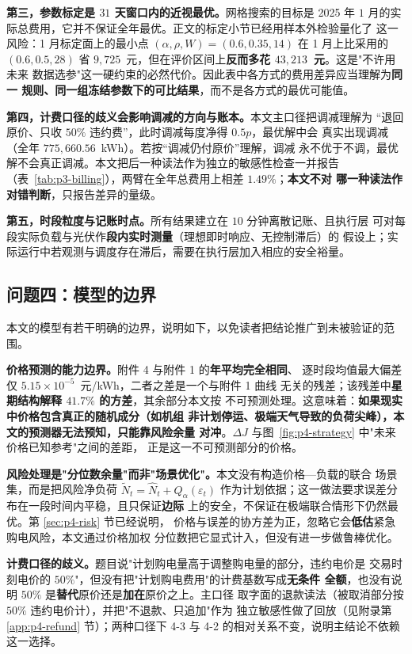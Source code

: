 \textbf{第三，参数标定是 $31$ 天窗口内的近视最优。}网格搜索的目标是 2025 年
$1$ 月的实际总费用，它并不保证全年最优。正文的标定小节已经用样本外检验量化了
这一风险：1 月标定面上的最小点
$(\alpha,\rho,W)=(0.6,0.35,14)$ 在 1 月上比采用的 $(0.6,0.5,28)$ 省
$9{,}725$~元，但在评价区间上\textbf{反而多花 $43{,}213$~元}。这是"不许用未来
数据选参"这一硬约束的必然代价。因此表中各方式的费用差异应当理解为\textbf{同一
规则、同一组冻结参数下的可比结果}，而不是各方式的最优可能值。

\textbf{第四，计费口径的歧义会影响调减的方向与账本。}本文主口径把调减理解为
“退回原价、只收 $50\%$ 违约费”，此时调减每度净得 $0.5p$，最优解中会
真实出现调减（全年 $775{,}660.56$~kWh）。若按“调减仍付原价”理解，调减
永不优于不调，最优解不会真正调减。本文把后一种读法作为独立的敏感性检查一并报告
（表~\ref{tab:p3-billing}），两臂在全年总费用上相差 $1.49\%$；\textbf{本文不对
哪一种读法作对错判断}，只报告差异的量级。

\textbf{第五，时段粒度与记账时点。}所有结果建立在 $10$ 分钟离散记账、且执行层
可对每段实际负载与光伏作\textbf{段内实时测量}（理想即时响应、无控制滞后）的
假设上；实际运行中若观测与调度存在滞后，需要在执行层加入相应的安全裕量。

\subsection{问题四：模型的边界}
\label{app:p4-limit}

本文的模型有若干明确的边界，说明如下，以免读者把结论推广到未被验证的范围。

\textbf{价格预测的能力边界。}附件 4 与附件 1 的\textbf{年平均完全相同}、
逐时段均值最大偏差仅 $5.15\times10^{-5}$~元/kWh，二者之差是一个与附件 1 曲线
无关的残差；该残差中\textbf{星期结构解释 $41.7\%$ 的方差}，其余部分本文按
不可预测处理。这意味着：\textbf{如果现实中价格包含真正的随机成分（如机组
非计划停运、极端天气导致的负荷尖峰），本文的预测器无法预知，只能靠风险余量
对冲}。$\Delta J$ 与图~\ref{fig:p4-strategy} 中"未来价格已知参考"之间的差距，
正是这一不可预测部分的价格。

\textbf{风险处理是"分位数余量"而非"场景优化"。}本文没有构造价格—负载的联合
场景集，而是把风险净负荷 $\widetilde N_t=\widehat N_t+Q_\alpha(\varepsilon_t)$
作为计划依据；这一做法要求误差分布在一段时间内平稳，且只保证\textbf{边际}
上的安全，不保证在极端联合情形下仍然最优。第 \ref{sec:p4-risk} 节已经说明，
价格与误差的协方差为正，忽略它会\textbf{低估}紧急购电风险，本文通过价格加权
分位数把它显式计入，但没有进一步做鲁棒优化。

\textbf{计费口径的歧义。}题目说"计划购电量高于调整购电量的部分，违约电价是
交易时刻电价的 $50\%$"，但没有把"计划购电费用"的计费基数写成\textbf{无条件
全额}，也没有说明 $50\%$ 是\textbf{替代}原价还是\textbf{加在}原价之上。主口径
取字面的退款读法（被取消部分按 $50\%$ 违约电价计），并把"不退款、只追加"作为
独立敏感性做了回放（见附录第 \ref{app:p4-refund} 节）；两种口径下 4-3 与 4-2
的相对关系不变，说明主结论不依赖这一选择。

